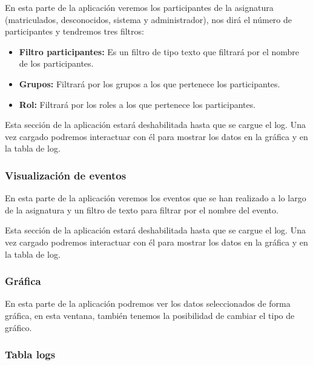 En esta parte de la aplicación veremos los participantes de la asignatura (matriculados, desconocidos, sistema y administrador), nos dirá el número de participantes y tendremos tres filtros:


\begin{itemize}
	\tightlist
	\item
	\textbf{Filtro participantes:} Es un filtro de tipo texto que filtrará por el nombre de los participantes.
	\item
	\textbf{Grupos:} Filtrará por los grupos a los que pertenece los participantes.
	\item
	\textbf{Rol:} Filtrará por los roles a los que pertenece los participantes.
	
\end{itemize}



Esta sección de la aplicación estará deshabilitada hasta que se cargue el log. Una vez cargado podremos interactuar con él para mostrar los datos en la gráfica y en la tabla de log.

\subsubsection{Visualización de eventos}

En esta parte de la aplicación veremos los eventos que se han realizado a lo largo de la asignatura y un filtro de texto para filtrar por el nombre del evento.



Esta sección de la aplicación estará deshabilitada hasta que se cargue el log. Una vez cargado podremos interactuar con él para mostrar los datos en la gráfica y en la tabla de log.

\subsubsection{Gráfica}

En esta parte de la aplicación podremos ver los datos seleccionados de forma gráfica, en esta ventana, también tenemos la posibilidad de cambiar el tipo de gráfico.


\subsubsection{Tabla logs}

